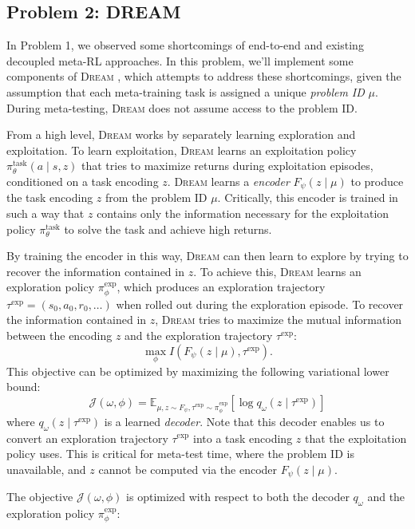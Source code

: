 \documentclass[12pt]{article}
\newcommand{\dream}{\textsc{Dream }}
\begin{document}
\subsection*{Problem 2: DREAM}
In Problem 1, we observed some shortcomings of end-to-end and existing decoupled meta-RL approaches.
In this problem, we'll implement some components of \dream, which attempts to address these shortcomings, given the assumption that each meta-training task is assigned a unique \emph{problem ID} $\mu$.
During meta-testing, \dream does not assume access to the problem ID.

From a high level, \dream works by separately learning exploration and exploitation.
To learn exploitation, \dream learns an exploitation policy $\pi_\theta^\text{task}(a \mid s, z)$ that tries to maximize returns during exploitation episodes, conditioned on a task encoding $z$.
\dream learns a \emph{encoder} $F_\psi(z \mid \mu)$ to produce the task encoding $z$ from the problem ID $\mu$.
Critically, this encoder is trained in such a way that $z$ contains only the information necessary for the exploitation policy $\pi_\theta^\text{task}$ to solve the task and achieve high returns.

By training the encoder in this way, \dream can then learn to explore by trying to recover the information contained in $z$.
To achieve this, \dream learns an exploration policy $\pi_\phi^\text{exp}$, which produces an exploration trajectory $\tau^\text{exp} = (s_0, a_0, r_0, \ldots)$ when rolled out during the exploration episode.
To recover the information contained in $z$, \dream tries to maximize the mutual information between the encoding $z$ and the exploration trajectory $\tau^\text{exp}$:
$$\max_{\phi}I(F_{\psi}(z \mid \mu), \tau^\text{exp}).$$
%
This objective can be optimized by maximizing the following variational lower bound:
%
\begin{equation*}
    \mathcal{J(\omega, \phi)} = \mathbb{E}_{\mu, z\sim F_{\psi},\tau^\text{exp} \sim \pi_\phi^\text{exp}}[\log q_{\omega}(z \mid \tau^\text{exp})]
\end{equation*}
%
where $q_{\omega}(z \mid \tau^\text{exp})$ is a learned \emph{decoder}.
Note that this decoder enables us to convert an exploration trajectory $\tau^\text{exp}$ into a task encoding $z$ that the exploitation policy uses.
This is critical for meta-test time, where the problem ID is unavailable, and $z$ cannot be computed via the encoder $F_\psi(z \mid \mu)$.

The objective $\mathcal{J}(\omega, \phi)$ is optimized with respect to both the decoder $q_\omega$ and the exploration policy $\pi_\phi^\text{exp}$:
\end{document}
